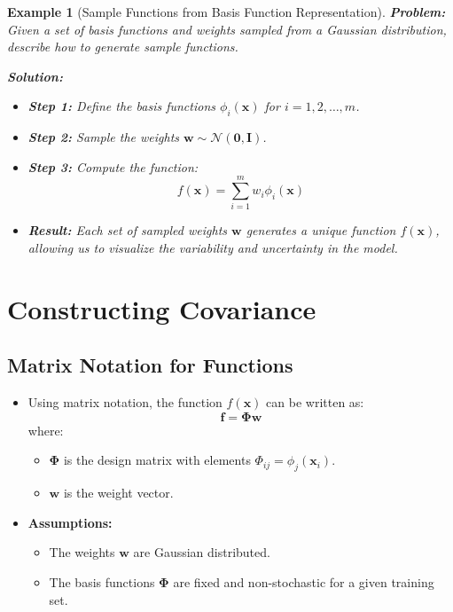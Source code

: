 \documentclass[12pt]{article}
\newtheorem{example}{Example}
\begin{document}
\begin{example}[Sample Functions from Basis Function Representation]
    \textbf{Problem:} Given a set of basis functions and weights sampled from a Gaussian distribution, describe how to generate sample functions.
    
    \textbf{Solution:}
    \begin{itemize}
        \item \textbf{Step 1:} Define the basis functions \( \phi_i(\mathbf{x}) \) for \( i = 1, 2, \ldots, m \).
        \item \textbf{Step 2:} Sample the weights \( \mathbf{w} \sim \mathcal{N}(\mathbf{0}, \mathbf{I}) \).
        \item \textbf{Step 3:} Compute the function:
        \[
        f(\mathbf{x}) = \sum_{i=1}^{m} w_i \phi_i(\mathbf{x})
        \]
        \item \textbf{Result:} Each set of sampled weights \( \mathbf{w} \) generates a unique function \( f(\mathbf{x}) \), allowing us to visualize the variability and uncertainty in the model.
    \end{itemize}
\end{example}

\section{Constructing Covariance}

\subsection{Matrix Notation for Functions}
\begin{itemize}
    \item Using matrix notation, the function \( f(\mathbf{x}) \) can be written as:
    \[
    \mathbf{f} = \mathbf{\Phi} \mathbf{w}
    \]
    where:
    \begin{itemize}
        \item \( \mathbf{\Phi} \) is the design matrix with elements \( \Phi_{ij} = \phi_j(\mathbf{x}_i) \).
        \item \( \mathbf{w} \) is the weight vector.
    \end{itemize}
    \item \textbf{Assumptions:}
    \begin{itemize}
        \item The weights \( \mathbf{w} \) are Gaussian distributed.
        \item The basis functions \( \mathbf{\Phi} \) are fixed and non-stochastic for a given training set.
    \end{itemize}
\end{itemize}
\end{document}
